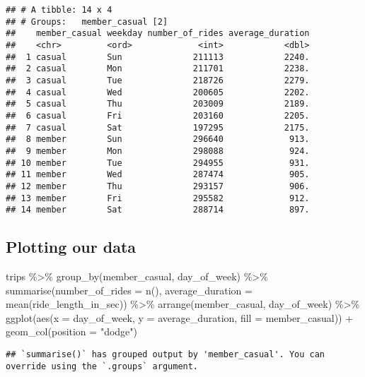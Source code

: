 \documentclass[
]{article}
\newenvironment{Shaded}{\begin{snugshade}}{\end{snugshade}}
\newcommand{\AttributeTok}[1]{\textcolor[rgb]{0.77,0.63,0.00}{#1}}
\newcommand{\FunctionTok}[1]{\textcolor[rgb]{0.00,0.00,0.00}{#1}}
\newcommand{\NormalTok}[1]{#1}
\newcommand{\SpecialCharTok}[1]{\textcolor[rgb]{0.00,0.00,0.00}{#1}}
\newcommand{\StringTok}[1]{\textcolor[rgb]{0.31,0.60,0.02}{#1}}
\begin{document}
\begin{verbatim}
## # A tibble: 14 x 4
## # Groups:   member_casual [2]
##    member_casual weekday number_of_rides average_duration
##    <chr>         <ord>             <int>            <dbl>
##  1 casual        Sun              211113            2240.
##  2 casual        Mon              211701            2238.
##  3 casual        Tue              218726            2279.
##  4 casual        Wed              200605            2202.
##  5 casual        Thu              203009            2189.
##  6 casual        Fri              203160            2205.
##  7 casual        Sat              197295            2175.
##  8 member        Sun              296640             913.
##  9 member        Mon              298088             924.
## 10 member        Tue              294955             931.
## 11 member        Wed              287474             905.
## 12 member        Thu              293157             906.
## 13 member        Fri              295582             912.
## 14 member        Sat              288714             897.
\end{verbatim}

\hypertarget{plotting-our-data}{%
\subsection{Plotting our data}\label{plotting-our-data}}

\begin{Shaded}
\begin{Highlighting}[]
\NormalTok{trips }\SpecialCharTok{\%\textgreater{}\%}
  \FunctionTok{group\_by}\NormalTok{(member\_casual, day\_of\_week) }\SpecialCharTok{\%\textgreater{}\%}
  \FunctionTok{summarise}\NormalTok{(}\AttributeTok{number\_of\_rides =} \FunctionTok{n}\NormalTok{(), }\AttributeTok{average\_duration =} \FunctionTok{mean}\NormalTok{(ride\_length\_in\_sec)) }\SpecialCharTok{\%\textgreater{}\%}
  \FunctionTok{arrange}\NormalTok{(member\_casual, day\_of\_week) }\SpecialCharTok{\%\textgreater{}\%}
  \FunctionTok{ggplot}\NormalTok{(}\FunctionTok{aes}\NormalTok{(}\AttributeTok{x =}\NormalTok{ day\_of\_week, }\AttributeTok{y =}\NormalTok{ average\_duration, }\AttributeTok{fill =}\NormalTok{ member\_casual)) }\SpecialCharTok{+}
  \FunctionTok{geom\_col}\NormalTok{(}\AttributeTok{position =} \StringTok{"dodge"}\NormalTok{)}
\end{Highlighting}
\end{Shaded}

\begin{verbatim}
## `summarise()` has grouped output by 'member_casual'. You can override using the `.groups` argument.
\end{verbatim}
\end{document}
